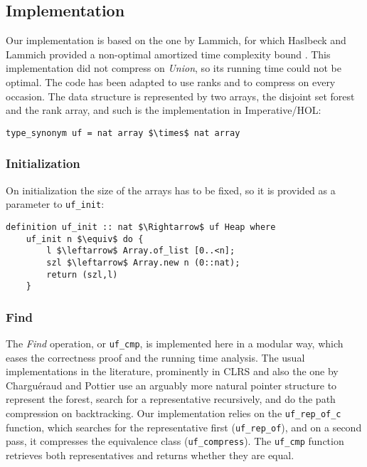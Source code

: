 \documentclass[headsepline,footsepline,footinclude=false,oneside,fontsize=11pt,paper=a4,listof=totoc,bibliography=totoc]{scrbook} %
\begin{document}
\subsection{Implementation}

Our implementation is based on the one by Lammich, for which Haslbeck and Lammich provided a non-optimal amortized time complexity bound \cite{HaslRef19}. This implementation did not compress on \textit{Union}, so its running time could not be optimal\label{bug}. The code has been adapted to use ranks and to compress on every occasion. The data structure is represented by two arrays, the disjoint set forest and the rank array, and such is the implementation in Imperative/HOL:

\begin{lstlisting}[mathescape=true,caption=The Datatype Representing the Data Structure,captionpos=b, label={The Datatype Representing the Data Structure}]
	type_synonym uf = nat array $\times$ nat array
\end{lstlisting}
\subsubsection{Initialization}

On initialization the size of the arrays has to be fixed, so it is provided as a parameter to \verb|uf_init|:

\begin{lstlisting}[mathescape=true,caption=The Initialisation Function,captionpos=b,label={The Initialisation Function}]
	definition uf_init :: nat $\Rightarrow$ uf Heap where
	uf_init n $\equiv$ do {
		l $\leftarrow$ Array.of_list [0..<n];
		szl $\leftarrow$ Array.new n (0::nat);
		return (szl,l)
	}
\end{lstlisting}

\vspace{-0.6cm}

\subsubsection{Find}

The \textit{Find} operation, or \verb|uf_cmp|, is implemented here in a modular way, which eases the correctness proof and the running time analysis. The usual implementations in the literature, prominently in CLRS \cite{CLRS09} and also the one by Charguéraud and Pottier \cite{chargueraud17} use an arguably more natural pointer structure to represent the forest, search for a representative recursively, and do the path compression on backtracking. Our implementation relies on the \verb|uf_rep_of_c| function, which searches for the representative first (\verb|uf_rep_of|), and on a second pass, it compresses the equivalence class (\verb|uf_compress|). The \verb|uf_cmp| function retrieves both representatives and returns whether they are equal.
\vspace{2cm}
\end{document}
